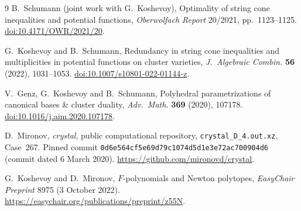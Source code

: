 \documentclass[11pt]{article}
\begin{document}
\begin{thebibliography}{9}
B.~Schumann (joint work with G.~Koshevoy),
Optimality of string cone inequalities and potential functions,
\emph{Oberwolfach Report} 20/2021, pp.~1123--1125.
\href{https://doi.org/10.4171/OWR/2021/20}{doi:10.4171/OWR/2021/20}.

G.~Koshevoy and B.~Schumann,
Redundancy in string cone inequalities and multiplicities in potential
functions on cluster varieties,
\emph{J.~Algebraic Combin.} \textbf{56} (2022), 1031--1053.
\href{https://doi.org/10.1007/s10801-022-01144-z}{doi:10.1007/s10801-022-01144-z}.

V.~Genz, G.~Koshevoy and B.~Schumann,
Polyhedral parametrizations of canonical bases \& cluster duality,
\emph{Adv.~Math.} \textbf{369} (2020), 107178.
\href{https://doi.org/10.1016/j.aim.2020.107178}{doi:10.1016/j.aim.2020.107178}.

D.~Mironov, \emph{crystal}, public computational repository,
\texttt{crystal\_D\_4.out.xz}, Case~267.
Pinned commit \texttt{0d6e564cf5e69d79c1074d5d1e3e72ac700904d6}
(commit dated 6 March 2020).
\url{https://github.com/mironovd/crystal}.

G.~Koshevoy and D.~Mironov,
$F$-polynomials and Newton polytopes,
\emph{EasyChair Preprint} 8975 (3 October 2022).
\url{https://easychair.org/publications/preprint/z55N}.
\end{thebibliography}
\end{document}
